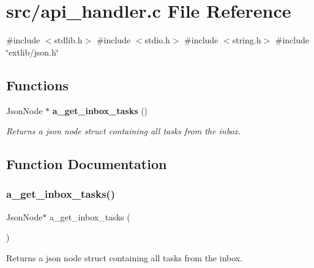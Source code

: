 \section{src/api\+\_\+handler.c File Reference}
\label{api__handler_8c}
{\ttfamily \#include $<$stdlib.\+h$>$}\newline
{\ttfamily \#include $<$stdio.\+h$>$}\newline
{\ttfamily \#include $<$string.\+h$>$}\newline
{\ttfamily \#include \char`\"{}extlib/json.\+h\char`\"{}}\newline
\subsection*{Functions}
\begin{DoxyCompactItemize}
\item 
Json\+Node $\ast$ \textbf{ a\+\_\+get\+\_\+inbox\+\_\+tasks} ()
\begin{DoxyCompactList}\small\item\em Returns a json node struct containing all tasks from the inbox. \end{DoxyCompactList}\end{DoxyCompactItemize}


\subsection{Function Documentation}
\mbox{\label{api__handler_8c_aad3b42b9a6dfd0a86a95eca2363dab11}} 
\subsubsection{a\+\_\+get\+\_\+inbox\+\_\+tasks()}
{\footnotesize\ttfamily Json\+Node$\ast$ a\+\_\+get\+\_\+inbox\+\_\+tasks (\begin{DoxyParamCaption}{ }\end{DoxyParamCaption})}



Returns a json node struct containing all tasks from the inbox. 


